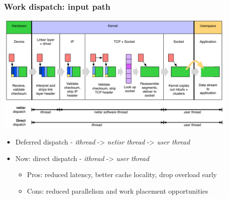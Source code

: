 \begin{frame}
  \frametitle{Work dispatch: input path}

  \begin{center}
    \includegraphics[width=0.9\textwidth]{../../figures/network-dispatch-input.pdf}
  \end{center}

  \begin{small}
  \begin{itemize}
    \pause
    \item Deferred dispatch - \textit{ithread} -> \textit{netisr thread} ->
      \textit{user thread}

    \pause

    \item Now: direct dispatch - \textit{ithread} -> \textit{user thread}
    \begin{itemize}
      \item Pros: reduced latency, better cache locality, drop overload early
      \item Cons: reduced parallelism and work placement opportunities
    \end{itemize}
  \end{itemize}
  \end{small}
\end{frame}

